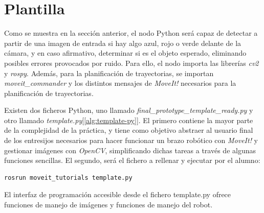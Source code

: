 \documentclass[12pt,spanish,chapterprefix, numbers=noenddot]{book}
\numberwithin{equation}{section}
\numberwithin{figure}{section}
\begin{document}
\section{Plantilla}
Como se muestra en la sección anterior, el nodo Python será capaz de detectar a partir de una imagen de entrada si hay algo azul, rojo o verde delante de la cámara, y en caso afirmativo, determinar si es el objeto esperado, eliminando posibles errores provocados por ruido. 
Para ello, el nodo importa las librerías \textit{cv2} y \textit{rospy}. Además, para la planificación de trayectorias, se importan \textit{moveit\_commander} y los distintos mensajes de \textit{MoveIt!} necesarios para la planificación de trayectorias.

Existen dos ficheros Python, uno llamado \textit{final\_prototype\_template\_ready.py} y otro llamado \textit{template.py}[\ref{alg:template-py}]. 
El primero contiene la mayor parte de la complejidad de la práctica, y tiene como objetivo abstraer al usuario final de los entresijos necesarios para hacer funcionar un brazo robótico con \textit{MoveIt!} y gestionar imágenes con \textit{OpenCV}, simplificando dichas tareas a través de algunas funciones sencillas. El segundo, será el fichero a rellenar y ejecutar por el alumno: 
\vspace{20pt}
	\begin{lstlisting}[frame=single]
    rosrun moveit_tutorials template.py
    \end{lstlisting}
    
El interfaz de programación accesible desde el fichero template.py ofrece funciones de manejo de imágenes y funciones de manejo del robot. 
\end{document}
